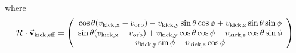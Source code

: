 \documentclass[12pt, letterpaper, twoside]{article}
\begin{document}
where
\begin{equation}
    \mathcal{R} \cdot \va{v}_{\rm kick, eff} = \left(
        \begin{array}{c}
         \cos \theta (v_{\rm kick, x}-v_{\rm orb})-v_{\rm kick, y} \sin \theta \cos \phi
           +v_{\rm kick, z} \sin \theta \sin \phi \\
         \sin \theta (v_{\rm kick, x}-v_{\rm orb})+v_{\rm kick, y} \cos \theta \cos \phi
           -v_{\rm kick, z} \cos \theta \sin \phi \\
         v_{\rm kick, y} \sin \phi+v_{\rm kick, z} \cos \phi \\
        \end{array}
        \right)
\end{equation}
\end{document}
